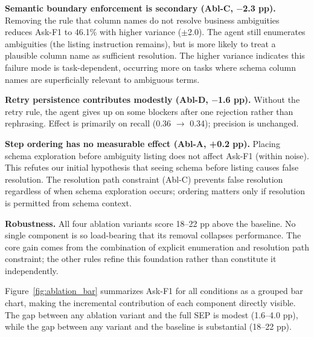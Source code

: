 \documentclass{article} %
\newcommand{\oursystem}{SEP} %
\begin{document}
\textbf{Semantic boundary enforcement is secondary (Abl-C, $-$2.3 pp).}
Removing the rule that column names do not resolve business ambiguities reduces
Ask-F1 to 46.1\% with higher variance ($\pm$2.0).
The agent still enumerates ambiguities (the listing instruction remains), but is more
likely to treat a plausible column name as sufficient resolution.
The higher variance indicates this failure mode is task-dependent, occurring more on
tasks where schema column names are superficially relevant to ambiguous terms.

\textbf{Retry persistence contributes modestly (Abl-D, $-$1.6 pp).}
Without the retry rule, the agent gives up on some blockers after one rejection rather
than rephrasing. Effect is primarily on recall (0.36 $\to$ 0.34); precision is unchanged.

\textbf{Step ordering has no measurable effect (Abl-A, +0.2 pp).}
Placing schema exploration before ambiguity listing does not affect Ask-F1 (within noise).
This refutes our initial hypothesis that seeing schema before listing causes false resolution.
The resolution path constraint (Abl-C) prevents false resolution regardless of when schema
exploration occurs; ordering matters only if resolution is permitted from schema context.

\textbf{Robustness.}
All four ablation variants score 18--22 pp above the baseline.
No single component is so load-bearing that its removal collapses performance.
The core gain comes from the combination of explicit enumeration and resolution path
constraint; the other rules refine this foundation rather than constitute it independently.

Figure~\ref{fig:ablation_bar} summarizes Ask-F1 for all conditions as a grouped bar
chart, making the incremental contribution of each component directly visible.
The gap between any ablation variant and the full \oursystem{} is modest (1.6--4.0 pp),
while the gap between any variant and the baseline is substantial (18--22 pp).
\end{document}
